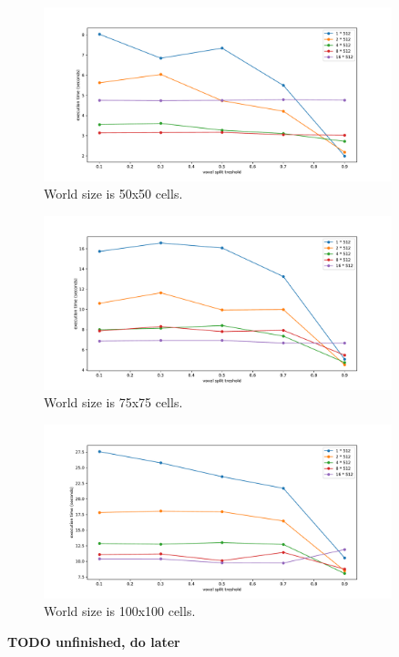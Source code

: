 \documentclass[12pt, oneside]{report}
\begin{document}
\begin{figure}[H]
  \centering
	\label{summary_dimer}
	\includegraphics[width=0.9\textwidth,keepaspectratio]{Images/SummaryOptimisation/results_50.pdf}
	\caption{World size is 50x50 cells.}
\end{figure}

\begin{figure}[H]
  \centering
	\label{summary_dimer}
	\includegraphics[width=0.9\textwidth,keepaspectratio]{Images/SummaryOptimisation/results_75.pdf}
	\caption{World size is 75x75 cells. }
\end{figure}

\begin{figure}[H]
  \centering
	\label{summary_dimer}
	\includegraphics[width=0.9\textwidth,keepaspectratio]{Images/SummaryOptimisation/results_100.pdf}
	\caption{World size is 100x100 cells.}
\end{figure}

\textbf{ TODO unfinished, do later}


\newpage
\printbibliography
\end{document}
